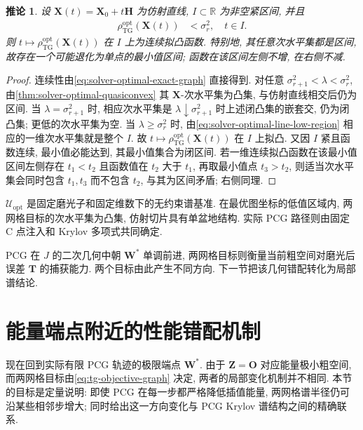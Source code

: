 \documentclass{ctexart}
\newcommand{\q}{\quad}
\newcommand{\R}{\mathbb{R}}
\renewcommand{\ge}{\geqslant}
\newtheorem{corollary}[theorem]{推论}
\begin{document}
\begin{corollary}
\label{cor:solver-optimal-line-unimodal}
设
$\bm X(t)=\bm X_0+t\bm H$ 为仿射直线, $I\subset\R$ 为非空紧区间,
并且
\begin{align}
    \rho_{\mathrm{TG}}^{\mathrm{opt}}(\bm X(t))
    &<\sigma_r^2,\q t\in I.
    \label{eq:solver-optimal-line-low-region}
\end{align}
则
$t\mapsto\rho_{\mathrm{TG}}^{\mathrm{opt}}(\bm X(t))$
在 $I$ 上为连续拟凸函数. 特别地, 其任意次水平集都是区间,
故存在一个可能退化为单点的最小值区间; 函数在该区间左侧不增,
在右侧不减.
\end{corollary}

\begin{proof}
连续性由\cref{eq:solver-optimal-exact-graph} 直接得到.
对任意
$\sigma_{r+1}^2<\lambda<\sigma_r^2$,
由\cref{thm:solver-optimal-quasiconvex} 其 $\bm X$-次水平集为凸集,
与仿射直线相交后仍为区间.
当 $\lambda=\sigma_{r+1}^2$ 时, 相应次水平集是
$\lambda\downarrow\sigma_{r+1}^2$ 时上述闭凸集的嵌套交,
仍为闭凸集; 更低的次水平集为空. 当 $\lambda\ge\sigma_r^2$ 时,
由\cref{eq:solver-optimal-line-low-region} 相应的一维次水平集就是整个 $I$.
故 $t\mapsto\rho_{\mathrm{TG}}^{\mathrm{opt}}(\bm X(t))$ 在 $I$ 上拟凸.
又因 $I$ 紧且函数连续, 最小值必能达到, 其最小值集合为闭区间.
若一维连续拟凸函数在该最小值区间左侧存在
$t_1<t_2$ 且函数值在 $t_2$ 大于 $t_1$, 再取最小值点 $t_3>t_2$,
则适当次水平集会同时包含 $t_1,t_3$ 而不包含 $t_2$, 与其为区间矛盾;
右侧同理.
\end{proof}


$\mathcal U_{\mathrm{opt}}$ 是固定磨光子和固定维数下的无约束谱基准. 在最优图坐标的低值区域内, 两网格目标的次水平集为凸集, 仿射切片具有单盆地结构. 实际 PCG 路径则由固定 C 点注入和 Krylov 多项式共同确定.

PCG 在 $J$ 的二次几何中朝 $\bm W^\ast$ 单调前进, 两网格目标则衡量当前粗空间对磨光后误差 $\bm T$ 的捕获能力. 两个目标由此产生不同方向. 下一节把该几何错配转化为局部谱结论.


\section{能量端点附近的性能错配机制}
\label{sec:local-mismatch-mechanism}

现在回到实际有限 PCG 轨迹的极限端点 $\bm W^\ast$. 由于 $\bm Z=\mathbf O$ 对应能量极小粗空间, 而两网格目标由\cref{eq:tg-objective-graph} 决定, 两者的局部变化机制并不相同. 本节的目标是定量说明: 即使 PCG 在每一步都严格降低插值能量, 两网格谱半径仍可沿某些相邻步增大; 同时给出这一方向变化与 PCG Krylov 谱结构之间的精确联系.
\end{document}
